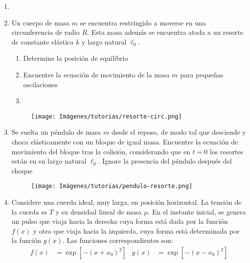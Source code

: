 \documentclass[letterpaper,11pt]{article}
\begin{document}
\vspace{-1cm}
\begin{enumerate}\setlength{\itemsep}{0.4cm}

\item[]

\item Un cuerpo de masa $m$ se encuentra restringido a moverse en una circunferencia de radio $R$. Esta masa además se encuentra atada a un resorte de constante elástica $k$ y largo natural $\ell_0$.

\begin{multicols}{2}
\begin{enumerate}
    \item Determine la posición de equilibrio

    \item Encuentre la ecuación de movimiento de la masa $m$ para pequeñas oscilaciones
    
    \item[]
\end{enumerate}
\columnbreak

\begin{figure}[H]
    \centering
    \texttt{[image: Imágenes/tutorias/resorte-circ.png]}
\end{figure}
\end{multicols}


\item
\begin{multicols}{2}
    Se suelta un péndulo de masa $m$ desde el reposo, de modo tal que desciende y choca elásticamente con un bloque de igual masa. Encuentre la ecuación de movimiento del bloque tras la colisión, considerando que en $t=0$ los resortes están en su largo natural $\ell_0$. Ignore la presencia del péndulo después del choque

    \columnbreak

    \begin{figure}[H]
        \centering
        \texttt{[image: Imágenes/tutorias/pendulo-resorte.png]}
    \end{figure}
\end{multicols}

\item Considere una cuerda ideal, muy larga, en posición horizontal. La tensión de la cuerda es $T$ y su densidad lineal de masa $\mu$. En el instante inicial, se genera un pulso que viaja hacia la derecha cuya forma está dada por la función $f(x)$ y otro que viaja hacia la izquierda, cuya forma está determinada por la función $g(x)$. Las funciones correspondientes son:
\begin{align*}
    f(x) &= \exp{[-(x+x_0)^2]} & g(x) &= \exp{[-(x-x_0)^2]}
\end{align*}


\end{enumerate}
\end{document}
